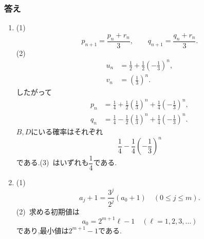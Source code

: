       \subsubsection{答え}\label{節：発展難易度：解答}\label{節：大学過去問ベースのもの：解答}
        \begin{enumerate}[label=\textbf{問\arabic*.},leftmargin=3.8em,format=\bookitemlink{practice-entrance}{answer}{problem}]
          \item (1)~
                \[
                  p_{n+1}=\frac{p_n+r_n}{3},\qquad
                  q_{n+1}=\frac{q_n+r_n}{3}.
                \]
                (2)~
                \[
                \begin{aligned}
                  u_n&=\frac12+\frac12\left(-\frac13\right)^n,\\
                  v_n&=\left(\frac13\right)^n.
                \end{aligned}
                \]
                したがって
                \[
                \begin{aligned}
                  p_n&=\frac14+\frac12\left(\frac13\right)^n
                       +\frac14\left(-\frac13\right)^n,\\
                  q_n&=\frac14-\frac12\left(\frac13\right)^n
                       +\frac14\left(-\frac13\right)^n.
                \end{aligned}
                \]
                $B,D$にいる確率はそれぞれ
                \[
                  \frac14-\frac14\left(-\frac13\right)^n
                \]
                である.(3)~はいずれも$\dfrac14$である.
          \item (1)~
                \[
                  a_j+1=\frac{3^j}{2^j}(a_0+1)
                  \quad(0\le j\le m).
                \]
                (2)~求める初期値は
                \[
                  a_0=2^{m+1}\ell-1
                  \quad(\ell=1,2,3,\ldots)
                \]
                であり,最小値は$2^{m+1}-1$である.


\end{enumerate}
